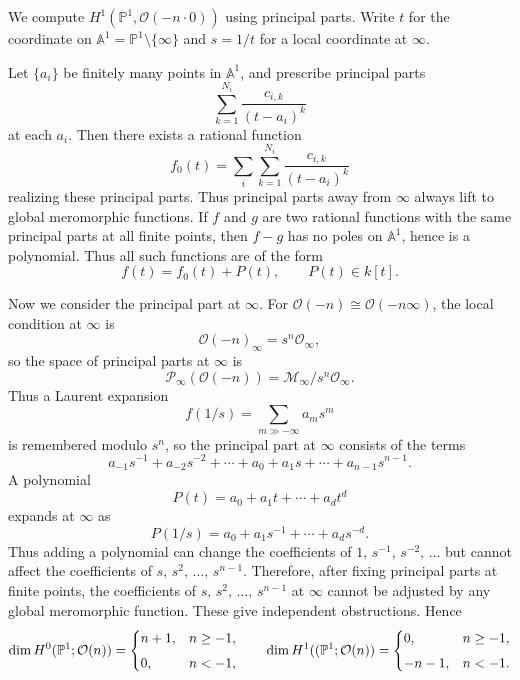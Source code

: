 \documentclass[12pt]{article}
\begin{document}
\begin{example}
    We compute $H^1(\mathbb P^1,\mathcal O(-n\cdot 0))$ using principal parts. Write
    $t$ for the coordinate on $\mathbb A^1 = \mathbb P^1 \setminus \{\infty\}$ and
    $s = 1/t$ for a local coordinate at $\infty$.

    Let $\{a_i\}$ be finitely many points in $\mathbb A^1$, and prescribe principal parts
    \[
        \sum_{k=1}^{N_i} \frac{c_{i,k}}{(t-a_i)^k}
    \]
    at each $a_i$. Then there exists a rational function
    \[
        f_0(t) = \sum_i \sum_{k=1}^{N_i} \frac{c_{i,k}}{(t-a_i)^k}
    \]
    realizing these principal parts. Thus principal parts away from $\infty$ always
    lift to global meromorphic functions.
    If $f$ and $g$ are two rational functions with the same principal parts at all
    finite points, then $f-g$ has no poles on $\mathbb A^1$, hence is a polynomial.
    Thus all such functions are of the form
    \[
        f(t) = f_0(t) + P(t), \qquad P(t) \in k[t].
    \]

    Now we consider the principal part at $\infty$. For $\mathcal O(-n) \cong \mathcal O(-n\infty)$, the local condition at $\infty$ is
    \[
        \mathcal O(-n)_\infty = s^n \mathcal O_\infty,
    \]
    so the space of principal parts at $\infty$ is
    \[
        \mathcal P_\infty(\mathcal O(-n)) = \mathcal M_\infty / s^n \mathcal O_\infty.
    \]
    Thus a Laurent expansion
    \[
        f(1/s) = \sum_{m \gg -\infty} a_m s^m
    \]
    is remembered modulo $s^n$, so the principal part at $\infty$ consists of the
    terms
    \[
        a_{-1}s^{-1} + a_{-2}s^{-2} + \cdots + a_0 + a_1 s + \cdots + a_{n-1}s^{n-1}.
    \]
    A polynomial
    \[
        P(t) = a_0 + a_1 t + \cdots + a_d t^d
    \]
    expands at $\infty$ as
    \[
        P(1/s) = a_0 + a_1 s^{-1} + \cdots + a_d s^{-d}.
    \]
    Thus adding a polynomial can change the coefficients of $1,\, s^{-1},\, s^{-2},\, \dots$
    but cannot affect the coefficients of
    $s,\, s^2,\, \dots,\, s^{n-1}$.
    Therefore, after fixing principal parts at finite points, the coefficients of
    $s,\, s^2,\, \dots,\, s^{n-1}$
    at $\infty$ cannot be adjusted by any global meromorphic function. These give
    independent obstructions. Hence
    \[
        \dim H^{0}(\mathbb{P}^{1};{\mathcal{O}}(n))
        =
        \begin{cases}
            n+1, & n\ge -1, \\[4pt]
            0,   & n < -1,
        \end{cases}
        \qquad
        \dim H^{1}((\mathbb{P}^{1};{\mathcal{O}}(n))
        =
        \begin{cases}
            0,    & n\ge -1, \\[4pt]
            -n-1, & n < -1.
        \end{cases}
    \]
\end{example}
\end{document}
